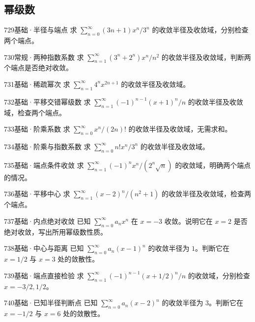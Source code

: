 \subsection{幂级数}
\begin{exercise}{729}{基础·半径与端点}
求 $\sum_{n=0}^{\infty}(3n+1)x^n/3^n$ 的收敛半径及收敛域，分别检查两个端点。
\end{exercise}
\begin{exercise}{730}{常规·两种指数系数}
求 $\sum_{n=1}^{\infty}(3^n+2^n)x^n/n^2$ 的收敛半径及收敛域，判断两个端点是否绝对收敛。
\end{exercise}
\begin{exercise}{731}{基础·稀疏幂次}
求 $\sum_{n=1}^{\infty}4^nx^{2n+1}$ 的收敛半径及收敛域。
\end{exercise}
\begin{exercise}{732}{基础·平移交错幂级数}
求 $\sum_{n=1}^{\infty}(-1)^{n-1}(x+1)^n/n$ 的收敛半径及收敛域，检查两个端点。
\end{exercise}
\begin{exercise}{733}{基础·阶乘系数}
求 $\sum_{n=0}^{\infty}x^n/(2n)!$ 的收敛半径及收敛域，无需求和。
\end{exercise}
\begin{exercise}{734}{基础·阶乘与指数系数}
求 $\sum_{n=0}^{\infty}n!x^n/3^n$ 的收敛半径及收敛域。
\end{exercise}
\begin{exercise}{735}{基础·端点条件收敛}
求 $\sum_{n=1}^{\infty}(-1)^nx^n/(2^n\sqrt n)$ 的收敛域，明确两个端点的情况。
\end{exercise}
\begin{exercise}{736}{基础·平移中心}
求 $\sum_{n=1}^{\infty}(x-2)^n/(n^2+1)$ 的收敛半径及收敛域，检查两个端点。
\end{exercise}
\begin{exercise}{737}{基础·内点绝对收敛}
已知 $\sum_{n=0}^{\infty}a_nx^n$ 在 $x=-3$ 收敛。说明它在 $x=2$ 是否绝对收敛，写出所用幂级数性质。
\end{exercise}
\begin{exercise}{738}{基础·中心与距离}
已知 $\sum_{n=0}^{\infty}a_n(x-1)^n$ 的收敛半径为 $1$。判断它在 $x=1/2$ 与 $x=3$ 处的敛散性。
\end{exercise}
\begin{exercise}{739}{基础·端点直接检验}
求 $\sum_{n=1}^{\infty}(-1)^{n-1}(x+1/2)^n/n$ 的收敛域，分别检查 $x=-3/2,1/2$。
\end{exercise}
\begin{exercise}{740}{基础·已知半径判断点}
已知 $\sum_{n=0}^{\infty}a_n(x-2)^n$ 的收敛半径为 $3$。判断它在 $x=-1/2$ 与 $x=6$ 处的敛散性。
\end{exercise}
